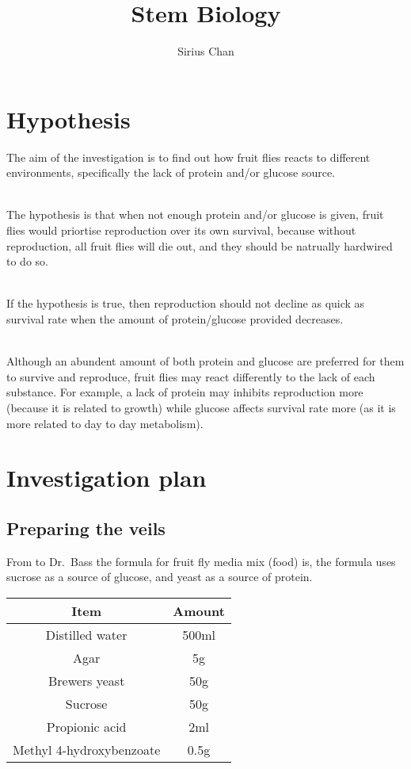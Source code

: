 \documentclass{article}
\title{Stem Biology}
\author{Sirius Chan}
\begin{document}
\maketitle

\newpage

\section{Hypothesis}

The aim of the investigation is to find out how fruit flies reacts to different environments, specifically the lack of protein and/or glucose source.

\noindent\\
The hypothesis is that when not enough protein and/or glucose is given, fruit flies would priortise reproduction over its own survival, because without reproduction, all fruit flies will die out, and they should be natrually hardwired to do so.

\noindent\\
If the hypothesis is true, then reproduction should not decline as quick as survival rate when the amount of protein/glucose provided decreases.

\noindent\\
Although an abundent amount of both protein and glucose are preferred for them to survive and reproduce, fruit flies may react differently to the lack of each substance. For example, a lack of protein may inhibits reproduction more (because it is related to growth) while glucose affects survival rate more (as it is more related to day to day metabolism).

\section{Investigation plan}
\subsection{Preparing the veils}

From to Dr.\ Bass the formula for fruit fly media mix (food) is, the formula uses sucrose as a source of glucose, and yeast as a source of protein.\\

{
\centering
\begin{tabular}{|c|c|}
  \hline
  Item & Amount\\
  \hline
  \hline
  Distilled water & 500ml\\
  Agar & 5g\\
  Brewers yeast & 50g\\
  Sucrose & 50g\\
  Propionic acid & 2ml\\
  Methyl 4-hydroxybenzoate & 0.5g\\
  \hline
\end{tabular}
\par
}
\end{document}
